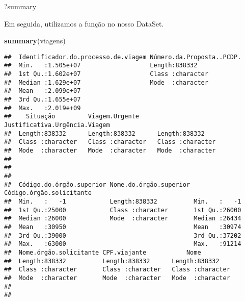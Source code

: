 \documentclass[
]{article}
\newenvironment{Shaded}{\begin{snugshade}}{\end{snugshade}}
\newcommand{\KeywordTok}[1]{\textcolor[rgb]{0.13,0.29,0.53}{\textbf{#1}}}
\newcommand{\NormalTok}[1]{#1}
\begin{document}
\begin{Shaded}
\begin{Highlighting}[]
\NormalTok{?summary}
\end{Highlighting}
\end{Shaded}

Em seguida, utilizamos a função no nosso DataSet.

\begin{Shaded}
\begin{Highlighting}[]
\KeywordTok{summary}\NormalTok{(viagens)}
\end{Highlighting}
\end{Shaded}

\begin{verbatim}
##  Identificador.do.processo.de.viagem Número.da.Proposta..PCDP.
##  Min.   :1.505e+07                   Length:838332            
##  1st Qu.:1.602e+07                   Class :character         
##  Median :1.629e+07                   Mode  :character         
##  Mean   :2.099e+07                                            
##  3rd Qu.:1.655e+07                                            
##  Max.   :2.019e+09                                            
##    Situação         Viagem.Urgente     Justificativa.Urgência.Viagem
##  Length:838332      Length:838332      Length:838332                
##  Class :character   Class :character   Class :character             
##  Mode  :character   Mode  :character   Mode  :character             
##                                                                     
##                                                                     
##                                                                     
##  Código.do.órgão.superior Nome.do.órgão.superior Código.órgão.solicitante
##  Min.   :   -1            Length:838332          Min.   :   -1           
##  1st Qu.:25000            Class :character       1st Qu.:26000           
##  Median :26000            Mode  :character       Median :26434           
##  Mean   :30950                                   Mean   :30974           
##  3rd Qu.:39000                                   3rd Qu.:37202           
##  Max.   :63000                                   Max.   :91214           
##  Nome.órgão.solicitante CPF.viajante           Nome          
##  Length:838332          Length:838332      Length:838332     
##  Class :character       Class :character   Class :character  
##  Mode  :character       Mode  :character   Mode  :character  
##                                                              
##                                                              

\end{verbatim}
\end{document}
